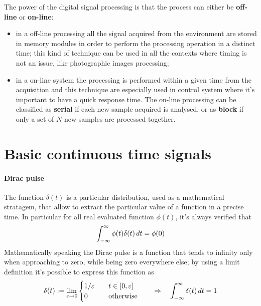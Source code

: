 	The power of the digital signal processing is that the process can either be \textbf{off-line} or \textbf{on-line}:
	\begin{itemize}
		\item in a off-line processing all the signal acquired from the environment are stored in memory modules in order to perform the processing operation in a distinct time; this kind of technique can be used in all the contexts where timing is not an issue, like photographic images processing;
		
		\item in a on-line system the processing is performed within a given time from the acquisition and this technique are especially used in control system where it's important to have a quick response time. The on-line processing can be classified as \textbf{serial} if each new sample acquired is analysed, or as \textbf{block} if only a set of $N$ new samples are processed together.  
	\end{itemize}

\section*{Basic continuous time signals}
	
	\paragraph{Dirac pulse} The  function $\delta (t)$ is a particular distribution, used as a mathematical stratagem, that allow to extract the particular value of a function in a precise time. In particular for all real evaluated function $\phi(t)$, it's always verified that 
	\begin{equation*}
		\int_{-\infty}^\infty \phi(t)\delta(t) \, dt = \phi(0)
	\end{equation*}
	Mathematically speaking the Dirac pulse is a function that tends to infinity only when approaching to zero, while being zero everywhere else; by using a limit definition it's possible to express this function as
	\begin{equation}
		\delta(t) := \lim_{\varepsilon \rightarrow 0} \begin{cases}
			1/\varepsilon \quad & t \in[0,\varepsilon] \\
			0 & \textrm{otherwise}
		\end{cases}
		\qquad \Rightarrow \quad \int_{-\infty}^\infty \delta(t)\, dt = 1
	\end{equation}
	
